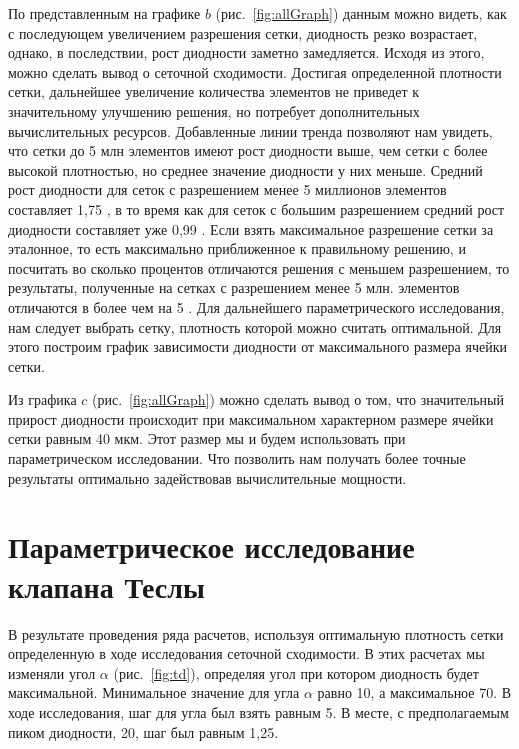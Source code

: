 \documentclass[10pt,a4paper]{book}
\begin{document}
    По представленным на графике $b$ (рис.~\ref{fig:allGraph}) данным можно видеть, как с последующем увеличением разрешения сетки, диодность резко возрастает, однако, в последствии, рост диодности заметно замедляется. Исходя из этого, можно сделать вывод о сеточной сходимости. Достигая определенной плотности сетки, дальнейшее увеличение количества элементов не приведет к значительному улучшению решения, но потребует дополнительных вычислительных ресурсов. Добавленные линии тренда позволяют нам увидеть, что сетки до 5 млн элементов имеют рост диодности выше, чем сетки с более высокой плотностью, но среднее значение диодности у них меньше. Средний рост диодности для сеток с разрешением менее 5 миллионов элементов составляет 1,75 \textdiscount, в то время как для сеток с большим разрешением средний рост диодности составляет уже 0,99 \textdiscount. Если взять максимальное разрешение сетки за эталонное, то есть максимально приближенное к правильному решению, и посчитать во сколько процентов отличаются решения с меньшем разрешением, то результаты, полученные на сетках с разрешением менее 5 млн. элементов отличаются в более чем на 5 \textdiscount. Для дальнейшего параметрического исследования, нам следует выбрать сетку, плотность которой можно считать оптимальной. Для этого построим график зависимости диодности от максимального размера ячейки сетки.
    
    Из графика $c$ (рис.~\ref{fig:allGraph}) можно сделать вывод о том, что значительный прирост диодности происходит при максимальном характерном размере ячейки сетки равным 40 мкм. Этот размер мы и будем использовать при параметрическом исследовании. Что позволить нам получать более точные результаты оптимально задействовав вычислительные мощности. 

    \section{Параметрическое исследование клапана Теслы}
    В результате проведения ряда расчетов, используя оптимальную плотность сетки определенную в ходе исследования сеточной сходимости. В этих расчетах мы изменяли угол $ \alpha $ (рис.~\ref{fig:td}), определяя угол при котором диодность будет максимальной. Минимальное значение для угла $ \alpha $ равно 10\textdegree, а максимальное 70\textdegree. В ходе исследования, шаг для угла был взять равным 5\textdegree. В месте, с предполагаемым пиком диодности, 20\textdegree, шаг был равным 1,25\textdegree. 
    
\end{document}
